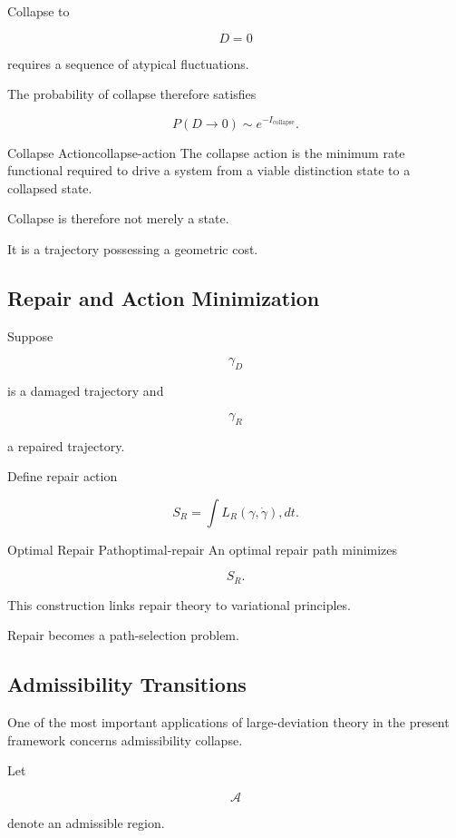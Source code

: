 \documentclass[12pt,twoside,openright]{book}
\begin{document}
Collapse to

\[
D=0
\]

requires a sequence of atypical fluctuations.

The probability of collapse therefore satisfies

\[
P(D\rightarrow0)
\sim
e^{-I_{\mathrm{collapse}}}.
\]

\begin{definition}{Collapse Action}{collapse-action}
The collapse action is the minimum rate functional
required to drive a system from a viable distinction state
to a collapsed state.
\end{definition}

Collapse is therefore not merely a state.

It is a trajectory possessing a geometric cost.

\subsection{Repair and Action Minimization}

Suppose

\[
\gamma_D
\]

is a damaged trajectory and

\[
\gamma_R
\]

a repaired trajectory.

Define repair action

\[
S_R
=
\int
L_R(\gamma,\dot\gamma)
,dt.
\]

\begin{definition}{Optimal Repair Path}{optimal-repair}
An optimal repair path minimizes

\[
S_R.
\]
\end{definition}

This construction links repair theory to variational
principles.

Repair becomes a path-selection problem.

\subsection{Admissibility Transitions}

One of the most important applications of large-deviation
theory in the present framework concerns admissibility
collapse.

Let

\[
\mathcal A
\]

denote an admissible region.
\end{document}
